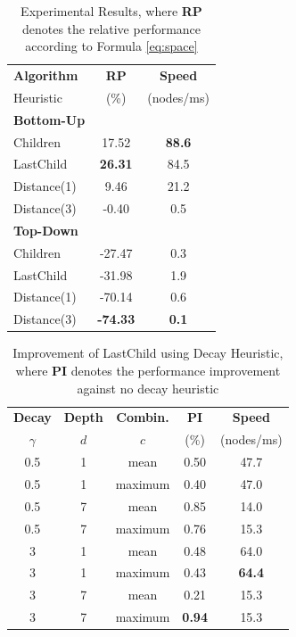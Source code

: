 \begin{table}[tb]
\centering
\caption{Experimental Results, where \textbf{RP} denotes the relative performance according to Formula \ref{eq:space}}
\label{tab:results}
\begin{tabular}{l c c}
\toprule
\textbf{Algorithm} & \textbf{RP} & \textbf{Speed}\\ 
Heuristic & (\%) & (nodes/ms)\\ 
\midrule

\textbf{Bottom-Up} & & \\
Children & 17.52 & \textbf{88.6} \\ 
LastChild & \textbf{26.31} & 84.5 \\ 
Distance(1) & 9.46 & 21.2 \\ 
Distance(3) & -0.40 & 0.5\\ 

\midrule

\textbf{Top-Down} & & \\
Children & -27.47 & 0.3 \\
LastChild & -31.98 & 1.9 \\
Distance(1) & -70.14 & 0.6 \\ 
Distance(3) & \textbf{-74.33} & \textbf{0.1}\\ 

\bottomrule
\end{tabular}
\end{table}

\begin{table}[t]
\centering

\caption{Improvement of LastChild using Decay Heuristic, where \textbf{PI} denotes the performance improvement against no decay heuristic}
\label{tab:decay}
\begin{tabular}{c c c c c}
\toprule
\textbf{Decay} & \textbf{Depth} &  \textbf{Combin.} & \textbf{PI} & \textbf{Speed}\\ 
$\gamma$ &$d$ &  $c$ &  (\%) & (nodes/ms)\\ 
\midrule
0.5&1& mean & 0.50 & 47.7\\ 
0.5& 1& maximum & 0.40 & 47.0 \\
0.5& 7& mean& 0.85 & 14.0 \\
0.5& 7& maximum & 0.76 & 15.3 \\
3&   1& mean & 0.48 & 64.0\\
3&   1& maximum & 0.43 & \textbf{64.4} \\
3&   7& mean & 0.21 & 15.3 \\ 
3&   7& maximum & \textbf{0.94} & 15.3 \\
\bottomrule
\end{tabular}
\end{table}

